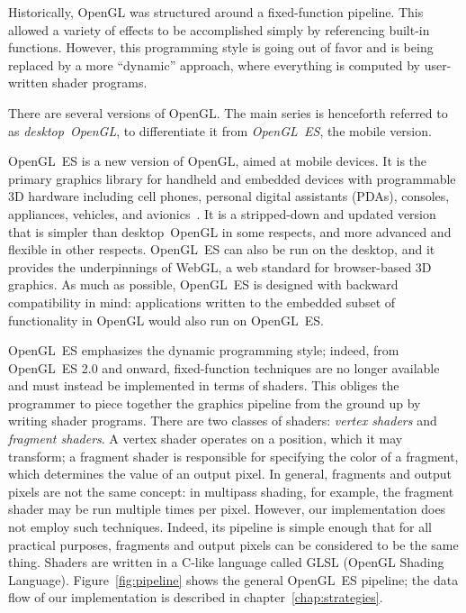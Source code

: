 \documentclass[english,12pt]{ifimaster}
\begin{document}

Historically, OpenGL was structured around a fixed-function pipeline.
This allowed a variety of effects to be accomplished simply by
referencing built-in functions. However, this programming style is
going out of favor and is being replaced by a more ``dynamic''
approach, where everything is computed by user-written shader
programs.

There are several versions of OpenGL. The main series is henceforth
referred to as \emph{desktop~OpenGL}, to differentiate it from
\emph{OpenGL~ES}, the mobile version.


OpenGL~ES is a new version of OpenGL, aimed at mobile devices. It is
the primary graphics library for handheld and embedded devices with
programmable 3D hardware including cell phones, personal digital
assistants (PDAs), consoles, appliances, vehicles, and
avionics~\citep{aaftab14:-opengl-es}. It is a stripped-down and
updated version that is simpler than desktop~OpenGL in some respects,
and more advanced and flexible in other respects. OpenGL~ES can also
be run on the desktop, and it provides the underpinnings of WebGL, a
web standard for browser-based 3D graphics. As much as possible,
OpenGL~ES is designed with backward compatibility in mind:
applications written to the embedded subset of functionality in OpenGL
would also run on OpenGL~ES.


OpenGL~ES emphasizes the dynamic programming style; indeed, from
OpenGL~ES 2.0 and onward, fixed-function techniques are no longer
available and must instead be implemented in terms of shaders. This
obliges the programmer to piece together the graphics pipeline from
the ground up by writing shader programs. There are two classes of
shaders: \emph{vertex shaders} and \emph{fragment shaders}. A vertex
shader operates on a position, which it may transform; a fragment
shader is responsible for specifying the color of a fragment, which
determines the value of an output pixel. In general, fragments and
output pixels are not the same concept: in multipass shading, for
example, the fragment shader may be run multiple times per pixel.
However, our implementation does not employ such techniques. Indeed,
its pipeline is simple enough that for all practical purposes,
fragments and output pixels can be considered to be the same thing.
Shaders are written in a C-like language called GLSL (OpenGL Shading
Language). Figure~\ref{fig:pipeline} shows the general OpenGL~ES
pipeline; the data flow of our implementation is described in
chapter~\ref{chap:strategies}.
\end{document}
